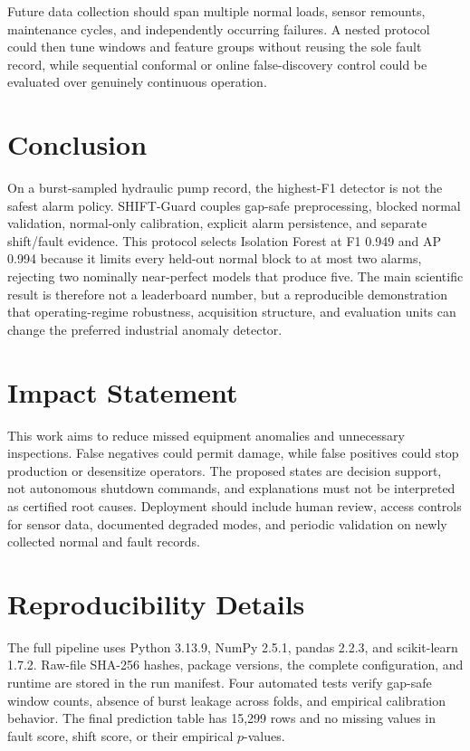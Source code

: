 \documentclass{article}
\begin{document}
Future data collection should span multiple normal loads, sensor remounts, maintenance cycles, and independently occurring failures. A nested protocol could then tune windows and feature groups without reusing the sole fault record, while sequential conformal or online false-discovery control could be evaluated over genuinely continuous operation.

\section{Conclusion}

On a burst-sampled hydraulic pump record, the highest-F1 detector is not the safest alarm policy. SHIFT-Guard couples gap-safe preprocessing, blocked normal validation, normal-only calibration, explicit alarm persistence, and separate shift/fault evidence. This protocol selects Isolation Forest at F1 0.949 and AP 0.994 because it limits every held-out normal block to at most two alarms, rejecting two nominally near-perfect models that produce five. The main scientific result is therefore not a leaderboard number, but a reproducible demonstration that operating-regime robustness, acquisition structure, and evaluation units can change the preferred industrial anomaly detector.

\section*{Impact Statement}

This work aims to reduce missed equipment anomalies and unnecessary inspections. False negatives could permit damage, while false positives could stop production or desensitize operators. The proposed states are decision support, not autonomous shutdown commands, and explanations must not be interpreted as certified root causes. Deployment should include human review, access controls for sensor data, documented degraded modes, and periodic validation on newly collected normal and fault records.




\clearpage
\appendix

\section{Reproducibility Details}

The full pipeline uses Python 3.13.9, NumPy 2.5.1, pandas 2.2.3, and scikit-learn 1.7.2. Raw-file SHA-256 hashes, package versions, the complete configuration, and runtime are stored in the run manifest. Four automated tests verify gap-safe window counts, absence of burst leakage across folds, and empirical calibration behavior. The final prediction table has 15,299 rows and no missing values in fault score, shift score, or their empirical $p$-values.
\end{document}
